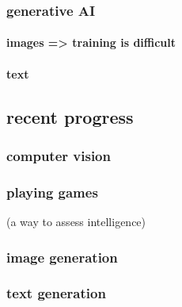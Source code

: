 \subsubsection{generative AI}
\paragraph{images => training is difficult}
\paragraph{text}

\subsection{recent progress}
\subsubsection{computer vision}
\subsubsection{playing games}
(a way to assess intelligence)
\subsubsection{image generation}
\subsubsection{text generation}
